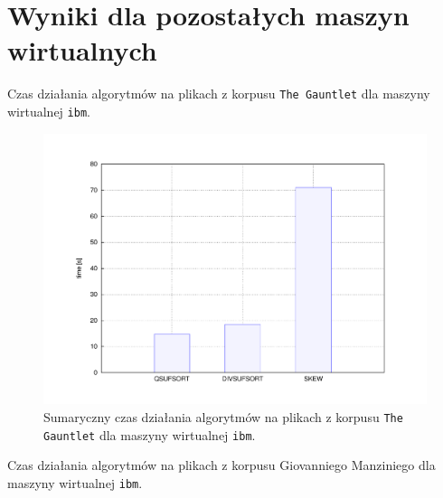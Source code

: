 
\chapter{Wyniki dla pozostałych maszyn wirtualnych}

\begin{table}[p]
	\begin{center}        
 		
    \end{center}                         
	\caption{Czas działania algorytmów na plikach z korpusu \texttt{The Gauntlet} dla maszyny wirtualnej \texttt{ibm}.}%
    \label{tab:ibm-gauntlet}
\end{table}

\begin{figure}[p]
   \begin{center}
        \includegraphics[width=\linewidth]{figures/results/ibm-gauntlet.pdf}
    \end{center}        
    \caption{Sumaryczny czas działania algorytmów na plikach z korpusu \texttt{The Gauntlet} dla maszyny wirtualnej \texttt{ibm}.}%
    \label{rys:ibm-gauntlet}
\end{figure}


\begin{table}[p]
	\begin{center}        
 		 
    \end{center}                         
	\caption{Czas działania algorytmów na plikach z korpusu Giovanniego Manziniego dla maszyny wirtualnej \texttt{ibm}.}%
    \label{tab:ibm-manzini}
\end{table}


